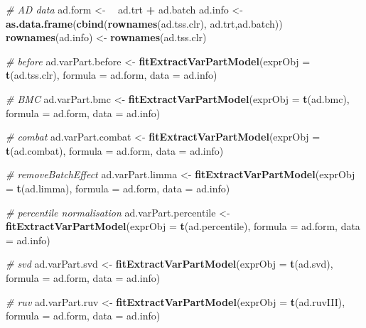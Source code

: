 \documentclass[]{book}
\newenvironment{Shaded}{\begin{snugshade}}{\end{snugshade}}
\newcommand{\KeywordTok}[1]{\textcolor[rgb]{0.13,0.29,0.53}{\textbf{#1}}}
\newcommand{\DataTypeTok}[1]{\textcolor[rgb]{0.13,0.29,0.53}{#1}}
\newcommand{\StringTok}[1]{\textcolor[rgb]{0.31,0.60,0.02}{#1}}
\newcommand{\CommentTok}[1]{\textcolor[rgb]{0.56,0.35,0.01}{\textit{#1}}}
\newcommand{\OperatorTok}[1]{\textcolor[rgb]{0.81,0.36,0.00}{\textbf{#1}}}
\newcommand{\ErrorTok}[1]{\textcolor[rgb]{0.64,0.00,0.00}{\textbf{#1}}}
\newcommand{\NormalTok}[1]{#1}
\begin{document}
\begin{Shaded}
\begin{Highlighting}[]
\CommentTok{# AD data}
\NormalTok{ad.form <-}\StringTok{ }\ErrorTok{~}\StringTok{ }\NormalTok{ad.trt }\OperatorTok{+}\StringTok{ }\NormalTok{ad.batch}
\NormalTok{ad.info <-}\StringTok{ }\KeywordTok{as.data.frame}\NormalTok{(}\KeywordTok{cbind}\NormalTok{(}\KeywordTok{rownames}\NormalTok{(ad.tss.clr), ad.trt,ad.batch))}
\KeywordTok{rownames}\NormalTok{(ad.info) <-}\StringTok{ }\KeywordTok{rownames}\NormalTok{(ad.tss.clr)}

\CommentTok{# before}
\NormalTok{ad.varPart.before <-}\StringTok{ }\KeywordTok{fitExtractVarPartModel}\NormalTok{(}\DataTypeTok{exprObj =} \KeywordTok{t}\NormalTok{(ad.tss.clr), }
                                            \DataTypeTok{formula =}\NormalTok{ ad.form, }\DataTypeTok{data =}\NormalTok{ ad.info)}

\CommentTok{# BMC}
\NormalTok{ad.varPart.bmc <-}\StringTok{ }\KeywordTok{fitExtractVarPartModel}\NormalTok{(}\DataTypeTok{exprObj =} \KeywordTok{t}\NormalTok{(ad.bmc), }
                                         \DataTypeTok{formula =}\NormalTok{ ad.form, }\DataTypeTok{data =}\NormalTok{ ad.info)}

\CommentTok{# combat}
\NormalTok{ad.varPart.combat <-}\StringTok{ }\KeywordTok{fitExtractVarPartModel}\NormalTok{(}\DataTypeTok{exprObj =} \KeywordTok{t}\NormalTok{(ad.combat), }
                                            \DataTypeTok{formula =}\NormalTok{ ad.form, }\DataTypeTok{data =}\NormalTok{ ad.info)}

\CommentTok{# removeBatchEffect}
\NormalTok{ad.varPart.limma <-}\StringTok{ }\KeywordTok{fitExtractVarPartModel}\NormalTok{(}\DataTypeTok{exprObj =} \KeywordTok{t}\NormalTok{(ad.limma), }
                                           \DataTypeTok{formula =}\NormalTok{ ad.form, }\DataTypeTok{data =}\NormalTok{ ad.info)}

\CommentTok{# percentile normalisation}
\NormalTok{ad.varPart.percentile <-}\StringTok{ }\KeywordTok{fitExtractVarPartModel}\NormalTok{(}\DataTypeTok{exprObj =} \KeywordTok{t}\NormalTok{(ad.percentile), }
                                                \DataTypeTok{formula =}\NormalTok{ ad.form, }\DataTypeTok{data =}\NormalTok{ ad.info)}

\CommentTok{# svd}
\NormalTok{ad.varPart.svd <-}\StringTok{ }\KeywordTok{fitExtractVarPartModel}\NormalTok{(}\DataTypeTok{exprObj =} \KeywordTok{t}\NormalTok{(ad.svd), }
                                         \DataTypeTok{formula =}\NormalTok{ ad.form, }\DataTypeTok{data =}\NormalTok{ ad.info)}

\CommentTok{# ruv}
\NormalTok{ad.varPart.ruv <-}\StringTok{ }\KeywordTok{fitExtractVarPartModel}\NormalTok{(}\DataTypeTok{exprObj =} \KeywordTok{t}\NormalTok{(ad.ruvIII), }
                                         \DataTypeTok{formula =}\NormalTok{ ad.form, }\DataTypeTok{data =}\NormalTok{ ad.info)}
\end{Highlighting}
\end{Shaded}
\end{document}
